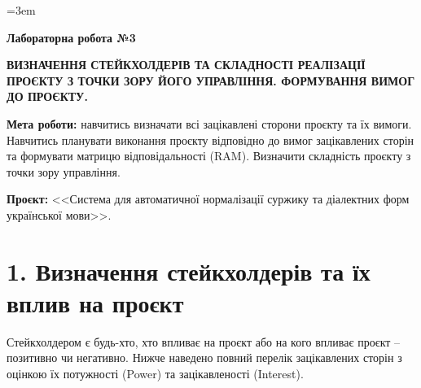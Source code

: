 \documentclass[14pt]{extarticle}
\begin{document}
\sloppy
\emergencystretch=3em

\begin{center}
\textbf{Лабораторна робота №3}

\medskip

\textbf{\MakeUppercase{Визначення стейкхолдерів та складності реалізації проєкту з точки зору його управління. Формування вимог до проєкту.}}
\end{center}

\medskip

\textbf{Мета роботи:} навчитись визначати всі зацікавлені сторони проєкту та їх вимоги. Навчитись планувати виконання проєкту відповідно до вимог зацікавлених сторін та формувати матрицю відповідальності (RAM). Визначити складність проєкту з точки зору управління.

\textbf{Проєкт:} <<Система для автоматичної нормалізації суржику та діалектних форм української мови>>.

\section*{1. Визначення стейкхолдерів та їх вплив на проєкт}

Стейкхолдером є будь-хто, хто впливає на проєкт або на кого впливає проєкт -- позитивно чи негативно. Нижче наведено повний перелік зацікавлених сторін з оцінкою їх потужності (Power) та зацікавленості (Interest).
\end{document}
